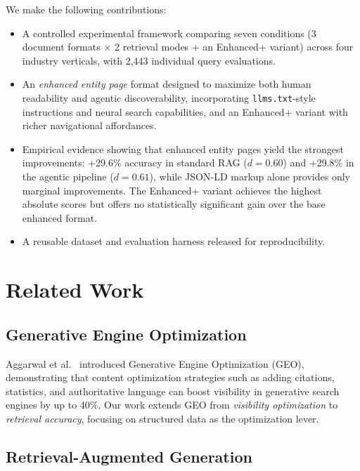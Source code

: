 \documentclass[runningheads]{llncs}
\begin{document}
We make the following contributions:
\begin{itemize}
    \item A controlled experimental framework comparing seven conditions
          (3 document formats $\times$ 2 retrieval modes + an Enhanced+
          variant) across four industry verticals, with 2,443 individual
          query evaluations.
    \item An \emph{enhanced entity page} format designed to maximize
          both human readability and agentic discoverability, incorporating
          \texttt{llms.txt}-style instructions and neural search capabilities,
          and an Enhanced+ variant with richer navigational affordances.
    \item Empirical evidence showing that enhanced entity pages yield
          the strongest improvements: +29.6\% accuracy in standard RAG
          ($d = 0.60$) and +29.8\% in the agentic pipeline
          ($d = 0.61$), while JSON-LD markup alone provides only
          marginal improvements.  The Enhanced+ variant achieves the
          highest absolute scores but offers no statistically significant
          gain over the base enhanced format.
    \item A reusable dataset and evaluation harness released for
          reproducibility.
\end{itemize}

\section{Related Work}
\label{sec:related}

\subsection{Generative Engine Optimization}

Aggarwal et al.~\cite{aggarwal2023geo} introduced Generative Engine
Optimization (GEO), demonstrating that content optimization strategies
such as adding citations, statistics, and authoritative language can
boost visibility in generative search engines by up to 40\%.
Our work extends GEO from \emph{visibility optimization} to
\emph{retrieval accuracy}, focusing on structured data as the
optimization lever.

\subsection{Retrieval-Augmented Generation}
\end{document}
